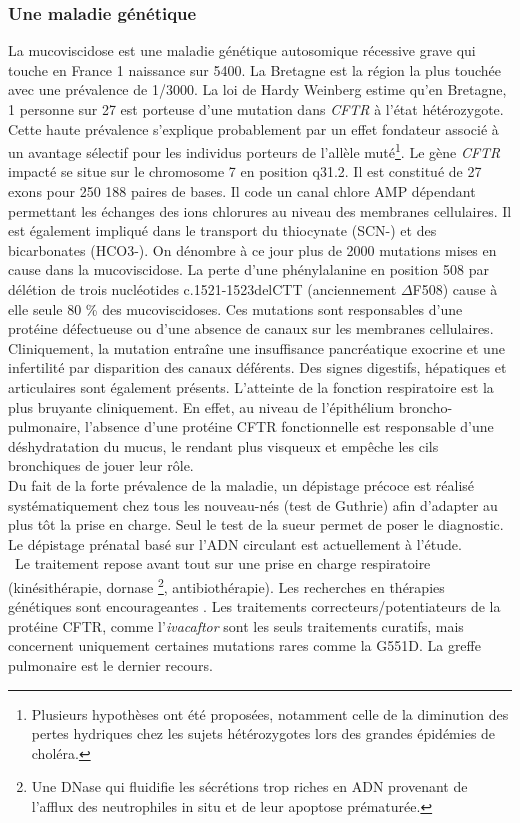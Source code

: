 \documentclass[12pt,a4paper]{article}
\begin{document}
\subsubsection{Une maladie génétique}
La mucoviscidose est une maladie génétique autosomique récessive grave qui touche en France 1 naissance sur 5400\cite{Registredelamuco.org}. La Bretagne est la région la plus touchée avec une prévalence de 1/3000\cite{Registredelamuco.org}.
La loi de Hardy Weinberg estime qu’en Bretagne, 1 personne sur 27 est porteuse d'une mutation dans \textit{CFTR} à l’état hétérozygote. Cette haute prévalence s’explique probablement par un effet fondateur associé à un avantage sélectif pour les individus porteurs de l’allèle muté\footnote{Plusieurs hypothèses ont été proposées, notamment celle de la diminution des pertes hydriques chez les sujets hétérozygotes lors des grandes épidémies de choléra.}.
Le gène \textit{CFTR} impacté se situe sur le chromosome 7 en position q31.2. Il est constitué de 27 exons pour 250 188\cite{OLeary2016} paires de bases. Il code un canal chlore AMP dépendant permettant les échanges des ions chlorures au niveau des membranes cellulaires. Il est également impliqué dans le transport du thiocynate (SCN-) et des bicarbonates (HCO3-)\cite{Quinton2001}.
On dénombre à ce jour plus de 2000 mutations \cite{cftrdb} mises en cause dans la mucoviscidose. La perte d’une phénylalanine en position 508 par délétion de trois nucléotides c.1521-1523delCTT (anciennement $\Delta$F508) cause à elle seule 80 \% des mucoviscidoses\cite{cftrdb}.
Ces mutations sont responsables d’une protéine défectueuse ou d’une absence de canaux sur les membranes cellulaires. \\
Cliniquement, la mutation entraîne une insuffisance pancréatique exocrine et une infertilité par disparition des canaux déférents. Des signes digestifs, hépatiques et articulaires sont également présents.
L'atteinte de la fonction respiratoire est la plus bruyante cliniquement. En effet, au niveau de l’épithélium broncho-pulmonaire, l’absence d’une protéine CFTR fonctionnelle est responsable d’une déshydratation du mucus, le rendant plus visqueux et empêche les cils bronchiques de jouer leur rôle.\\
Du fait de la forte prévalence de la maladie, un dépistage précoce est réalisé systématiquement chez tous les nouveau-nés (test de Guthrie) afin d’adapter au plus tôt la prise en charge. Seul le test de la sueur permet de poser le diagnostic. Le dépistage prénatal basé sur l’ADN circulant est actuellement à l’étude\cite{Guissart2017}.\\\
Le traitement repose avant tout sur une prise en charge respiratoire (kinésithérapie, dornase \footnote{Une DNase qui fluidifie les sécrétions trop riches en ADN provenant de l'afflux des neutrophiles in situ et de leur apoptose prématurée.}, antibiothérapie). Les recherches en thérapies génétiques sont encourageantes \cite{Montier2004}.
Les traitements correcteurs/potentiateurs de la protéine CFTR, comme l'\textit{ivacaftor} sont les seuls traitements curatifs, mais concernent uniquement certaines mutations rares comme la G551D. La greffe pulmonaire est le dernier recours.
\end{document}
